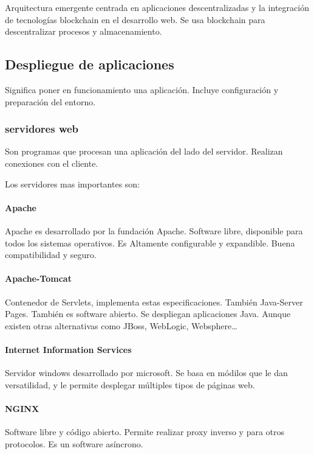         Arquitectura emergente centrada en aplicaciones descentralizadas y la integración de tecnologías blockchain en el desarrollo web. Se usa blockchain para descentralizar procesos y almacenamiento.

\subsection{Despliegue de aplicaciones}

    Significa poner en funcionamiento una aplicación. Incluye configuración y preparación del entorno.

    \subsubsection{servidores web}

        Son programas que procesan una aplicación del lado del servidor. Realizan conexiones con el cliente.

        Los servidores mas importantes son:
        
        \paragraph{Apache}
            Apache es desarrollado por la fundación Apache. Software libre, disponible para todos los sistemas operativos. Es Altamente configurable y expandible. Buena compatibilidad y seguro.

        \paragraph{Apache-Tomcat}
            Contenedor de Servlets, implementa estas especificaciones. También Java-Server Pages. También es software abierto. Se despliegan aplicaciones Java. Aunque existen otras alternativas como JBoss, WebLogic, Websphere\dots

        \paragraph{Internet Information Services}
            Servidor windows desarrollado por microsoft. Se basa en módilos que le dan versatilidad, y le permite desplegar múltiples tipos de páginas web.

        \paragraph{NGINX}
            Software libre y código abierto. Permite realizar proxy inverso y para otros protocolos. Es un software asíncrono.

